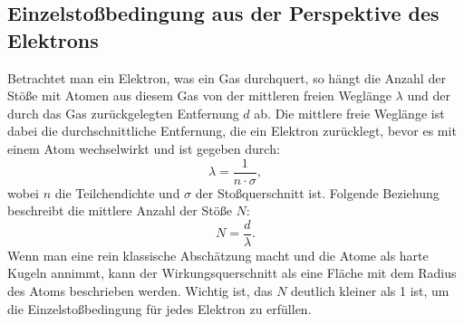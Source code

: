 \subsection{Einzelstoßbedingung aus der Perspektive des Elektrons}
Betrachtet man ein Elektron, was ein Gas durchquert, so hängt die Anzahl der Stöße mit Atomen aus diesem Gas von der mittleren freien Weglänge $\lambda$ und der durch das Gas zurückgelegten Entfernung $d$ ab. Die mittlere freie Weglänge ist dabei die durchschnittliche Entfernung, die ein Elektron zurücklegt, bevor es mit einem Atom wechselwirkt und ist gegeben durch:
\begin{equation}
    \lambda = \frac{1}{n \cdot \sigma},
\end{equation}
wobei $n$ die Teilchendichte und $\sigma$ der Stoßquerschnitt ist.
Folgende Beziehung beschreibt die mittlere Anzahl der Stöße $N$:
\begin{equation}
    N = \frac{d}{\lambda}.
\end{equation}
Wenn man eine rein klassische Abschätzung macht und die Atome als harte Kugeln annimmt, kann der Wirkungsquerschnitt als eine Fläche mit dem Radius des Atoms beschrieben werden. Wichtig ist, das $N$ deutlich kleiner als 1 ist, um die Einzelstoßbedingung für jedes Elektron zu erfüllen. 